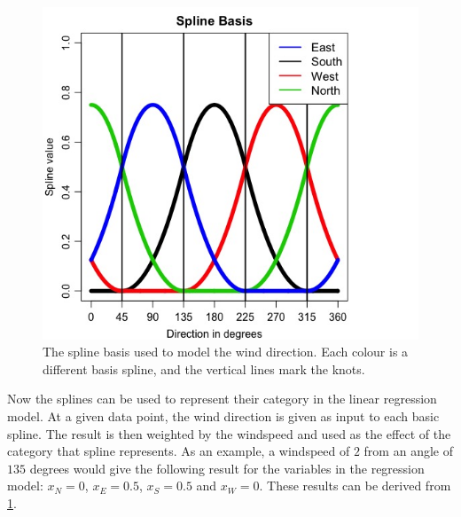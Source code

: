 \begin{figure}[ht]
    \centering
    \includegraphics[scale=.5]{../../../figures/SplineBasis.jpeg}
    \caption{The spline basis used to model the wind direction. Each colour is a different basis spline, and the vertical lines mark the knots.}
    \label{fig:spline_basis}
\end{figure}

\noindent Now the splines can be used to represent their category in the linear regression model. At a given data point, the wind direction is given as input to each basic spline. The result is then weighted by the windspeed and used as the effect of the category that spline represents. As an example, a windspeed of $2$ from an angle of $135$ degrees would give the following result for the variables in the regression model: $x_N=0$, $x_E=0.5$, $x_S=0.5$ and $x_W=0$. These results can be derived from \cref{fig:spline_basis}.

